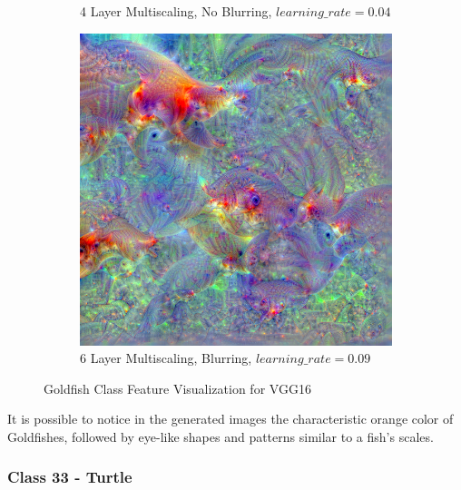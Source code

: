\begin{figure}
\begin{subfigure}[t]{0.31\textwidth}
        \caption{4 Layer Multiscaling, No Blurring, \(learning\_rate = 0.04\)}
    \end{subfigure}
    \hfill
    \begin{subfigure}[t]{0.31\textwidth}
        \captionsetup{justification=centering}
        \centering
        \includegraphics[width=.7\linewidth]{figuras/feat_vis/experiments/classes/cl1/random_image_ci1_lr9e-2_pl6.png}
        \caption{6 Layer Multiscaling, Blurring, \(learning\_rate = 0.09\)}
    \end{subfigure}

    \caption{Goldfish Class Feature Visualization for VGG16}
    \label{fig:class_goldfish}
\end{figure}

It is possible to notice in the generated images the characteristic orange color of Goldfishes, followed by eye-like shapes and patterns similar to a fish's scales.

\subsubsection{Class 33 - Turtle}

